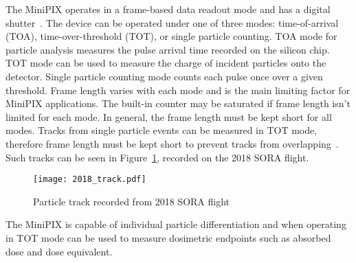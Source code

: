 The MiniPIX operates in a frame-based data readout mode and has a digital shutter~\cite{stuartthesis}. The device can be operated under one of three modes: time-of-arrival (TOA), time-over-threshold (TOT), or single particle counting.  TOA mode for particle analysis measures the pulse arrival time recorded on the silicon chip.  TOT mode can be used to measure the charge of incident particles onto the detector.  Single particle counting mode counts each pulse once over a given threshold. Frame length varies with each mode and is the main limiting factor for MiniPIX applications.  The built-in counter may be saturated if frame length isn't limited for each mode.  In general, the frame length must be kept short for all modes.  Tracks from single particle events can be measured in TOT mode, therefore frame length must be kept short to prevent tracks from overlapping~\cite{stuartthesis}.  Such tracks can be seen in Figure~\ref{fig:sample_2018}, recorded on the 2018 SORA flight.
%
\begin{figure}[H] %
    \centering
    \texttt{[image: 2018\_track.pdf]} 
    \caption{Particle track recorded from 2018 SORA flight}
    \label{fig:sample_2018}
\end{figure}

%
%
%
%
The MiniPIX is capable of individual particle differentiation and when operating in TOT mode can be used to measure dosimetric endpoints such as absorbed dose and dose equivalent.

